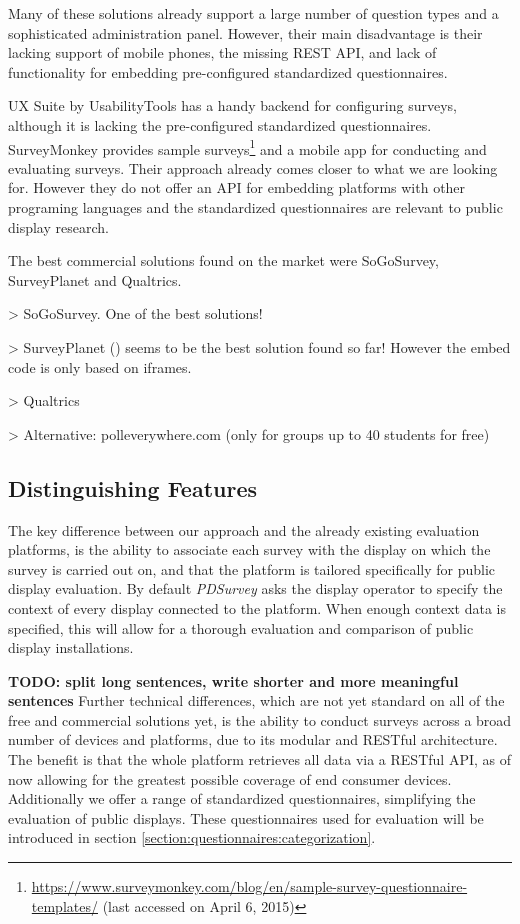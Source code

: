 	Many of these solutions already support a large number of question types and a sophisticated administration panel. However, their main disadvantage is their lacking support of mobile phones, the missing REST API, and lack of functionality for embedding pre-configured standardized questionnaires. %

	UX Suite by UsabilityTools has a handy backend for configuring surveys, although it is lacking the pre-configured standardized questionnaires. 
	SurveyMonkey provides sample surveys\footnote{\url{https://www.surveymonkey.com/blog/en/sample-survey-questionnaire-templates/} (last accessed on April 6, 2015)} and a mobile app for conducting and evaluating surveys. Their approach already comes closer to what we are looking for. However they do not offer an API for embedding platforms with other programing languages and the standardized questionnaires are relevant to public display research.

	The best commercial solutions found on the market were SoGoSurvey, SurveyPlanet and Qualtrics. 

		> SoGoSurvey. One of the best solutions!

		> SurveyPlanet () seems to be the best solution found so far! However the embed code is only based on iframes.

		> Qualtrics

		> Alternative: polleverywhere.com (only for groups up to 40 students for free)




	\subsection{Distinguishing Features}

	The key difference between our approach and the already existing evaluation platforms, is the ability to associate each survey with the display on which the survey is carried out on, and that the platform is tailored specifically for public display evaluation.
	By default \textit{PDSurvey} asks the display operator to specify the context of every display connected to the platform. When enough context data is specified, this will allow for a thorough evaluation and comparison of public display installations.


		\textbf{TODO: split long sentences, write shorter and more meaningful sentences}
		Further technical differences, which are not yet standard on all of the free and commercial solutions yet, is the ability to conduct surveys across a broad number of devices and platforms, due to its modular and RESTful architecture. The benefit is that the whole platform retrieves all data via a RESTful API, as of now allowing for the greatest possible coverage of end consumer devices. Additionally we offer a range of standardized questionnaires, simplifying the evaluation of public displays. These questionnaires used for evaluation will be introduced in section \ref{section:questionnaires:categorization}.

